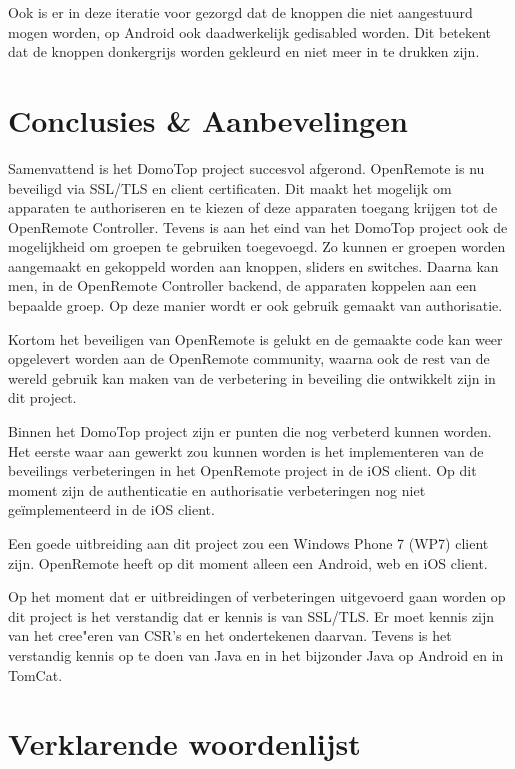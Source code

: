 \documentclass[]{article}
\begin{document}
Ook is er in deze iteratie voor gezorgd dat de knoppen die niet aangestuurd
mogen worden, op Android ook daadwerkelijk gedisabled worden. Dit betekent dat
de knoppen donkergrijs worden gekleurd en niet meer in te drukken zijn.


\newpage
\section{Conclusies \& Aanbevelingen}
Samenvattend is het DomoTop project succesvol afgerond. OpenRemote is nu beveiligd
via SSL/TLS en client certificaten. Dit maakt het mogelijk om apparaten te
authoriseren en te kiezen of deze apparaten toegang krijgen tot de
OpenRemote Controller. Tevens is aan het eind van het DomoTop project ook de
mogelijkheid om groepen te gebruiken toegevoegd. Zo kunnen er groepen worden aangemaakt en
gekoppeld worden aan knoppen, sliders en switches. Daarna kan men, in de OpenRemote
Controller backend, de apparaten koppelen aan een bepaalde groep. Op deze
manier wordt er ook gebruik gemaakt van authorisatie.

Kortom het beveiligen van OpenRemote is gelukt en de gemaakte code kan weer
opgelevert worden aan de OpenRemote community, waarna ook de rest van de wereld
gebruik kan maken van de verbetering in beveiling die ontwikkelt zijn in dit
project. 

Binnen het DomoTop project zijn er punten die nog verbeterd kunnen worden. Het eerste waar
aan gewerkt zou kunnen worden is het implementeren van de beveilings
verbeteringen in het OpenRemote project in de iOS client. Op dit moment zijn de
authenticatie en authorisatie verbeteringen nog niet ge\"implementeerd in de iOS
client.

Een goede uitbreiding aan dit project zou een Windows Phone 7 (WP7) client zijn.
OpenRemote heeft op dit moment alleen een Android, web en iOS client. 

Op het moment dat er uitbreidingen of verbeteringen uitgevoerd gaan worden op
dit project is het verstandig dat er kennis is van SSL/TLS. Er moet kennis zijn
van het cree"eren van CSR's en het ondertekenen daarvan. Tevens is het
verstandig kennis op te doen van Java en in het bijzonder Java op Android en in
TomCat.

\newpage
\section{Verklarende woordenlijst}
\end{document}
